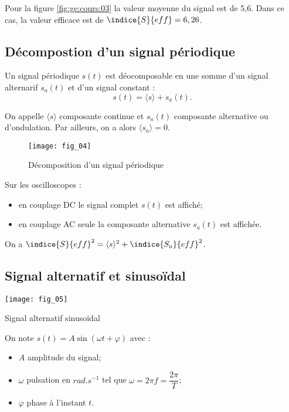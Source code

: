 Pour la figure \ref{fig:ge:cours:03} la valeur moyenne du signal est de 5,6. Dans ce cas, la valeur efficace est de $\indice{S}{eff} = 6,26$.

\subsection{Décompostion d'un signal périodique}
\begin{prop}
Un signal périodique $s(t)$ est déocomposable en une somme d'un signal alternarif $s_a(t)$ et d'un signal constant : 
$$ s(t)= \langle s \rangle + s_a(t) .$$

On appelle  $\langle s \rangle$ composante continue et $s_a(t)$ composante alternative ou d'ondulation. Par ailleurs, on a alors $\langle s_a \rangle = 0$. 
\end{prop}

\begin{figure}[!h]
\texttt{[image: fig\_04]}
\caption{Décomposition d'un signal périodique\label{fig:ge:cours:04}}
\end{figure}

Sur les oscilloscopes : 
\begin{itemize}
\item en couplage DC le signal complet $s(t)$ est affiché;
\item en couplage AC seule la composante alternative $s_a(t)$ est affichée.
\end{itemize}

On a $\indice{S}{eff}^2 = \langle s \rangle^2 + \indice{S_a}{eff}^2$.

\subsection{Signal alternatif et sinusoïdal}

\begin{marginfigure}
\texttt{[image: fig\_05]}
\caption{Signal alternatif sinusoïdal \label{fig:ge:cours:05}}
\end{marginfigure}
\begin{defi}
On note $s(t)=A\sin\left(\omega t + \varphi\right)$ avec : 
\begin{itemize}
\item  $A$ amplitude du signal;
\item  $\omega$ pulsation en $\si{rad.s^{-1}}$ tel que $\omega = 2\pi f = \dfrac{2\pi}{T}$;
\item  $\varphi$  phase à l'instant $t$.
\end{itemize}
\end{defi}


